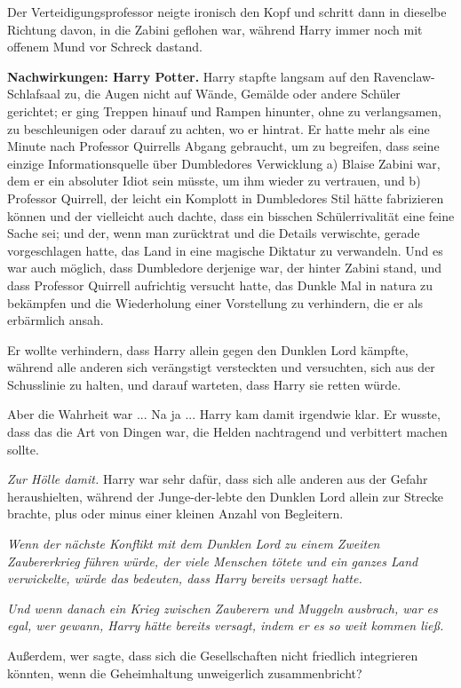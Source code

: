 Der Verteidigungsprofessor neigte ironisch den Kopf und schritt dann in dieselbe
Richtung davon, in die Zabini geflohen war, während Harry immer noch mit offenem
Mund vor Schreck dastand.

\textbf{Nachwirkungen: Harry Potter.}
Harry stapfte langsam auf den Ravenclaw-Schlafsaal zu, die Augen nicht auf
Wände, Gemälde oder andere Schüler gerichtet; er ging Treppen hinauf und Rampen
hinunter, ohne zu verlangsamen, zu beschleunigen oder darauf zu achten, wo er
hintrat. Er hatte mehr als eine Minute nach Professor Quirrells Abgang
gebraucht, um zu begreifen, dass seine einzige Informationsquelle über
Dumbledores Verwicklung a) Blaise Zabini war, dem er ein absoluter Idiot sein
müsste, um ihm wieder zu vertrauen, und b) Professor Quirrell, der leicht ein
Komplott in Dumbledores Stil hätte fabrizieren können und der vielleicht auch
dachte, dass ein bisschen Schülerrivalität eine feine Sache sei; und der, wenn
man zurücktrat und die Details verwischte, gerade vorgeschlagen hatte, das Land
in eine magische Diktatur zu verwandeln. Und es war auch möglich, dass
Dumbledore derjenige war, der hinter Zabini stand, und dass Professor Quirrell
aufrichtig versucht hatte, das Dunkle Mal in natura zu bekämpfen und die
Wiederholung einer Vorstellung zu verhindern, die er als erbärmlich ansah.

Er wollte verhindern, dass Harry allein gegen den Dunklen Lord kämpfte, während
alle anderen sich verängstigt versteckten und versuchten, sich aus der
Schusslinie zu halten, und darauf warteten, dass Harry sie retten würde.

Aber die Wahrheit war ... Na ja ... Harry kam damit irgendwie klar. Er wusste,
dass das die Art von Dingen war, die Helden nachtragend und verbittert machen
sollte.

\emph{Zur Hölle damit.} Harry war sehr dafür, dass sich alle anderen aus der
Gefahr heraushielten, während der Junge-der-lebte den Dunklen Lord allein zur
Strecke brachte, plus oder minus einer kleinen Anzahl von Begleitern.

\emph{Wenn der nächste Konflikt mit dem Dunklen Lord zu einem Zweiten
Zaubererkrieg führen würde, der viele Menschen tötete und ein ganzes Land
verwickelte, würde das bedeuten, dass Harry bereits versagt hatte.}

\emph{Und wenn danach ein Krieg zwischen Zauberern und Muggeln ausbrach, war es
egal, wer gewann, Harry hätte bereits versagt, indem er es so weit kommen ließ.}

Außerdem, wer sagte, dass sich die Gesellschaften nicht friedlich integrieren
könnten, wenn die Geheimhaltung unweigerlich zusammenbricht?

